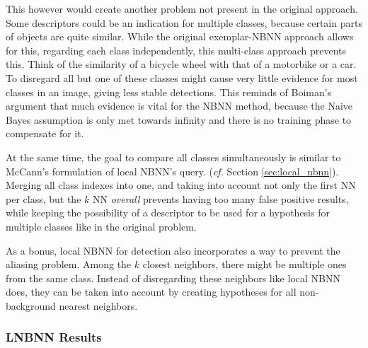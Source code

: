 This however would create another problem not present in the original approach. Some descriptors could be an indication for multiple classes, because certain parts of objects are quite similar. While the original exemplar-NBNN approach allows for this, regarding each class independently, this multi-class approach prevents this. Think of the similarity of a bicycle wheel with that of a motorbike or a car. To disregard all but one of these classes might cause very little evidence for most classes in an image, giving less stable detections. This reminds of Boiman's argument that much evidence is vital for the NBNN method, because the Naive Bayes assumption is only met towards infinity and there is no training phase to compensate for it.\cite{boiman2008defense}

At the same time, the goal to compare all classes simultaneously is similar to McCann's formulation of local NBNN's query.\cite{mccann2012local} (\emph{cf.} Section \ref{sec:local_nbnn}). Merging all class indexes into one, and taking into account not only the first NN per class, but the $k$ NN \emph{overall} prevents having too many false positive results, while keeping the possibility of a descriptor to be used for a hypothesis for multiple classes like in the original problem.

As a bonus, local NBNN for detection also incorporates a way to prevent the aliasing problem. Among the $k$ closest neighbors, there might be multiple ones from the same class. Instead of disregarding these neighbors like local NBNN does, they can be taken into account by creating hypotheses for all non-background nearest neighbors.


\subsubsection{LNBNN Results} %
\label{ssub:lnbnn_results}



\begin{figure}[hbt]
    \centering
\end{figure}

\begin{figure}[hbt]
    \centering
\end{figure}

\begin{table}[hbt]
    \centering
\end{table}

\begin{table}[hbt]
    \centering
\end{table}

